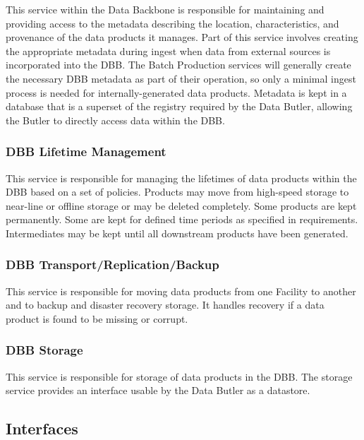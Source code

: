 \documentclass[DM,toc,lsstdraft]{lsstdoc}
\begin{document}
This service within the Data Backbone is responsible for maintaining and providing access to the metadata describing the location, characteristics, and provenance of the data products it manages.
Part of this service involves creating the appropriate metadata during ingest when data from external sources is incorporated into the DBB.
The Batch Production services will generally create the necessary DBB metadata as part of their operation, so only a minimal ingest process is needed for internally-generated data products.
Metadata is kept in a database that is a superset of the registry required by the Data Butler, allowing the Butler to directly access data within the DBB.

\subsubsection{DBB Lifetime Management}\label{dbb-lifetime-metadata}

This service is responsible for managing the lifetimes of data products within the DBB based on a set of policies.
Products may move from high-speed storage to near-line or offline storage or may be deleted completely.
Some products are kept permanently.
Some are kept for defined time periods as specified in requirements.
Intermediates may be kept until all downstream products have been generated.

\subsubsection{DBB Transport/Replication/Backup}\label{dbb-transport-repl}

This service is responsible for moving data products from one Facility to another and to backup and disaster recovery storage.
It handles recovery if a data product is found to be missing or corrupt.

\subsubsection{DBB Storage}\label{dbb-storage}

This service is responsible for storage of data products in the DBB.
The storage service provides an interface usable by the Data Butler as a datastore.

\subsection{Interfaces}\label{backbone-interfaces}
\end{document}

